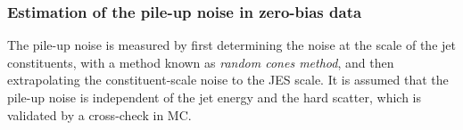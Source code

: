 \subsubsection{Estimation of the pile-up noise in zero-bias data}
\label{subsec:pile-up-noise}
The pile-up noise is measured by first determining the noise at the scale of the jet constituents, with a method known as \emph{random cones method}, and then extrapolating the constituent-scale noise to the JES scale. It is assumed that the pile-up noise is independent of the jet energy and the hard scatter, which is validated by a cross-check in MC.



